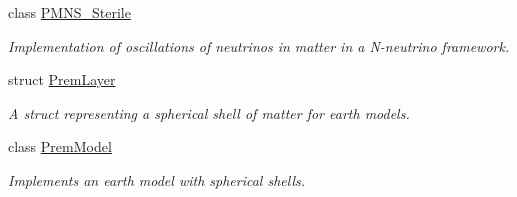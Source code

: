 \begin{DoxyCompactItemize}
class \hyperlink{classOscProb_1_1PMNS__Sterile}{P\+M\+N\+S\+\_\+\+Sterile}
\begin{DoxyCompactList}\small\item\em Implementation of oscillations of neutrinos in matter in a N-\/neutrino framework. \end{DoxyCompactList}\item 
struct \hyperlink{structOscProb_1_1PremLayer}{Prem\+Layer}
\begin{DoxyCompactList}\small\item\em A struct representing a spherical shell of matter for earth models. \end{DoxyCompactList}\item 
class \hyperlink{classOscProb_1_1PremModel}{Prem\+Model}
\begin{DoxyCompactList}\small\item\em Implements an earth model with spherical shells. \end{DoxyCompactList}\end{DoxyCompactItemize}
